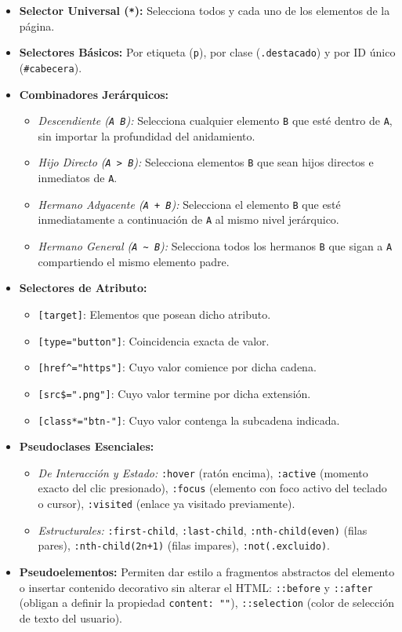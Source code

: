 \begin{itemize}[leftmargin=1.2cm]
  \item \textbf{Selector Universal (\texttt{*}):} Selecciona todos y cada uno de los elementos de la página.
  \item \textbf{Selectores Básicos:} Por etiqueta (\texttt{p}), por clase (\texttt{.destacado}) y por ID único (\texttt{\#cabecera}).
  \item \textbf{Combinadores Jerárquicos:}
    \begin{itemize}
      \item \textit{Descendiente (\texttt{A B}):} Selecciona cualquier elemento \texttt{B} que esté dentro de \texttt{A}, sin importar la profundidad del anidamiento.
      \item \textit{Hijo Directo (\texttt{A > B}):} Selecciona elementos \texttt{B} que sean hijos directos e inmediatos de \texttt{A}.
      \item \textit{Hermano Adyacente (\texttt{A + B}):} Selecciona el elemento \texttt{B} que esté inmediatamente a continuación de \texttt{A} al mismo nivel jerárquico.
      \item \textit{Hermano General (\texttt{A \~{} B}):} Selecciona todos los hermanos \texttt{B} que sigan a \texttt{A} compartiendo el mismo elemento padre.
    \end{itemize}
  \item \textbf{Selectores de Atributo:}
    \begin{itemize}
      \item \texttt{[target]}: Elementos que posean dicho atributo.
      \item \texttt{[type="button"]}: Coincidencia exacta de valor.
      \item \texttt{[href\^{}="https"]}: Cuyo valor comience por dicha cadena.
      \item \texttt{[src\$=".png"]}: Cuyo valor termine por dicha extensión.
      \item \texttt{[class*="btn-"]}: Cuyo valor contenga la subcadena indicada.
    \end{itemize}
  \item \textbf{Pseudoclases Esenciales:}
    \begin{itemize}
      \item \textit{De Interacción y Estado:} \texttt{:hover} (ratón encima), \texttt{:active} (momento exacto del clic presionado), \texttt{:focus} (elemento con foco activo del teclado o cursor), \texttt{:visited} (enlace ya visitado previamente).
      \item \textit{Estructurales:} \texttt{:first-child}, \texttt{:last-child}, \texttt{:nth-child(even)} (filas pares), \texttt{:nth-child(2n+1)} (filas impares), \texttt{:not(.excluido)}.
    \end{itemize}
  \item \textbf{Pseudoelementos:} Permiten dar estilo a fragmentos abstractos del elemento o insertar contenido decorativo sin alterar el HTML: \texttt{::before} y \texttt{::after} (obligan a definir la propiedad \texttt{content: ""}), \texttt{::selection} (color de selección de texto del usuario).
\end{itemize}


